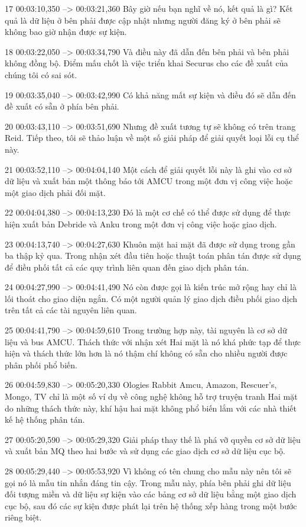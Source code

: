17
00:03:10,350 --> 00:03:21,360
Bây giờ nếu bạn nghĩ về nó, kết quả là gì?  Kết quả là dữ liệu ở bên phải được cập nhật nhưng người đăng ký ở bên phải sẽ không bao giờ nhận được sự kiện.

18
00:03:22,050 --> 00:03:34,790
Và điều này đã dẫn đến bên phải và bên phải không đồng bộ.  Điểm mấu chốt là việc triển khai Securus cho các đề xuất của chúng tôi có sai sót.

19
00:03:35,040 --> 00:03:42,990
Có khả năng mất sự kiện và điều đó sẽ dẫn đến đề xuất có sẵn ở phía bên phải.

20
00:03:43,110 --> 00:03:51,690
Nhưng đề xuất tương tự sẽ không có trên trang Reid.  Tiếp theo, tôi sẽ thảo luận về một số giải pháp để giải quyết loại lỗi cụ thể này.

21
00:03:52,110 --> 00:04:04,140
Một cách để giải quyết lỗi này là ghi vào cơ sở dữ liệu và xuất bản một thông báo tới AMCU trong một đơn vị công việc hoặc một giao dịch phải đối mặt.

22
00:04:04,380 --> 00:04:13,230
Đó là một cơ chế có thể được sử dụng để thực hiện xuất bản Debride và Anku trong một đơn vị công việc hoặc giao dịch.

23
00:04:13,740 --> 00:04:27,630
Khuôn mặt hai mặt đã được sử dụng trong gần ba thập kỷ qua.  Trong nhận xét đầu tiên hoặc thuật toán phân tán được sử dụng để điều phối tất cả các quy trình liên quan đến giao dịch phân tán.

24
00:04:27,990 --> 00:04:41,490
Nó còn được gọi là kiến ​​trúc mở rộng hay chỉ là lối thoát cho giao diện ngắn.  Có một người quản lý giao dịch điều phối giao dịch trên tất cả các tài nguyên liên quan.

25
00:04:41,790 --> 00:04:59,610
Trong trường hợp này, tài nguyên là cơ sở dữ liệu và bus AMCU.  Thách thức với nhận xét Hai mặt là nó khá phức tạp để thực hiện và thách thức lớn hơn là nó thậm chí không có sẵn cho nhiều người được phân phối phổ biến.

26
00:04:59,830 --> 00:05:20,330
Ologies Rabbit Amcu, Amazon, Rescuer's, Mongo, TV chỉ là một số ví dụ về công nghệ không hỗ trợ truyện tranh Hai mặt do những thách thức này, khí hậu hai mặt không phổ biến lắm với các nhà thiết kế hệ thống phân tán.

27
00:05:20,590 --> 00:05:29,320
Giải pháp thay thế là phá vỡ quyền cơ sở dữ liệu và xuất bản MQ theo hai bước và sử dụng các giao dịch cơ sở dữ liệu cục bộ.

28
00:05:29,440 --> 00:05:53,920
Vì không có tên chung cho mẫu này nên tôi sẽ gọi nó là mẫu tin nhắn đáng tin cậy.  Trong mẫu này, phía bên phải ghi dữ liệu đối tượng miền và dữ liệu sự kiện vào các bảng cơ sở dữ liệu bằng một giao dịch cục bộ, sau đó các sự kiện được phát lại trên hệ thống xếp hàng trong một bước riêng biệt.

